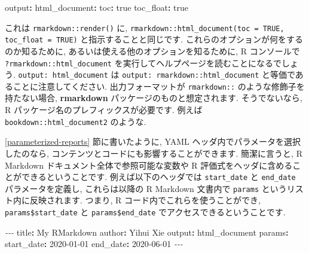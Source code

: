 \documentclass[
  11pt,
]{bxjsreport}
\newenvironment{Shaded}{\begin{snugshade}}{\end{snugshade}}
\newcommand{\AttributeTok}[1]{\textcolor[rgb]{0.77,0.63,0.00}{#1}}
\newcommand{\CharTok}[1]{\textcolor[rgb]{0.31,0.60,0.02}{#1}}
\newcommand{\FunctionTok}[1]{\textcolor[rgb]{0.00,0.00,0.00}{#1}}
\newcommand{\KeywordTok}[1]{\textcolor[rgb]{0.13,0.29,0.53}{\textbf{#1}}}
\newcommand{\PreprocessorTok}[1]{\textcolor[rgb]{0.56,0.35,0.01}{\textit{#1}}}
\newcommand{\StringTok}[1]{\textcolor[rgb]{0.31,0.60,0.02}{#1}}
\begin{document}
\begin{Shaded}
\begin{Highlighting}[]
\FunctionTok{output}\KeywordTok{:}
\AttributeTok{  }\FunctionTok{html\_document}\KeywordTok{:}
\AttributeTok{    }\FunctionTok{toc}\KeywordTok{:}\AttributeTok{ }\CharTok{true}
\AttributeTok{    }\FunctionTok{toc\_float}\KeywordTok{:}\AttributeTok{ }\CharTok{true}
\end{Highlighting}
\end{Shaded}

これは \texttt{rmarkdown::render()} に, \texttt{rmarkdown::html\_document(toc = TRUE, toc\_float = TRUE)} と指示することと同じです. これらのオプションが何をするのか知るために, あるいは使える他のオプションを知るために, R コンソールで \texttt{?rmarkdown::html\_document} を実行してヘルプページを読むことになるでしょう. \texttt{output: html\_document} は \texttt{output: rmarkdown::html\_document} と等価であることに注意してください. 出力フォーマットが \texttt{rmarkdown::} のような修飾子を持たない場合, \textbf{rmarkdown} パッケージのものと想定されます. そうでないなら, R パッケージ名のプレフィックスが必要です. 例えば \texttt{bookdown::html\_document2} のような.

\ref{parameterized-reports} 節に書いたように, YAML ヘッダ内でパラメータを選択したのなら, コンテンツとコードにも影響することができます. 簡潔に言うと, R Markdown ドキュメント全体で参照可能な変数や R 評価式をヘッダに含めることができるということです. 例えば以下のヘッダでは \texttt{start\_date} と \texttt{end\_date} パラメータを定義し, これらは以降の R Markdown 文書内で \texttt{params} というリスト内に反映されます. つまり, R コード内でこれらを使うことができ, \texttt{params\$start\_date} と \texttt{params\$end\_date} でアクセスできるということです.

\begin{Shaded}
\begin{Highlighting}[]
\PreprocessorTok{{-}{-}{-}}
\FunctionTok{title}\KeywordTok{:}\AttributeTok{ My RMarkdown}
\FunctionTok{author}\KeywordTok{:}\AttributeTok{ Yihui Xie}
\FunctionTok{output}\KeywordTok{:}\AttributeTok{ html\_document}
\FunctionTok{params}\KeywordTok{:}
\AttributeTok{  }\FunctionTok{start\_date}\KeywordTok{:}\AttributeTok{ }\StringTok{\textquotesingle{}2020{-}01{-}01\textquotesingle{}}
\AttributeTok{  }\FunctionTok{end\_date}\KeywordTok{:}\AttributeTok{ }\StringTok{\textquotesingle{}2020{-}06{-}01\textquotesingle{}}
\PreprocessorTok{{-}{-}{-}}
\end{Highlighting}
\end{Shaded}
\end{document}
